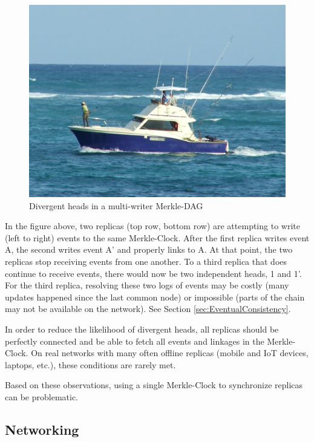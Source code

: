 \documentclass{comjnl}
\begin{document}
\begin{figure}
  \includegraphics[width=\linewidth]{boat.jpg}
  \caption{Divergent heads in a multi-writer Merkle-DAG }
  \label{fig:merkledag}
\end{figure}

In the figure above, two replicas (top row, bottom row) are attempting to write (left to right) events to the same Merkle-Clock. After the first replica writes event A, the second writes event A’ and properly links to A. At that point, the two replicas stop receiving events from one another. To a third replica that does continue to receive events, there would now be two independent heads, 1 and 1’. For the third replica, resolving these two logs of events may be costly (many updates happened since the last common node) or impossible (parts of the chain may not be available on the network). See Section  \ref{sec:EventualConsistency}.

In order to reduce the likelihood of divergent heads, all replicas should be perfectly connected and be able to fetch all events and linkages in the Merkle-Clock. On real networks with many often offline replicas (mobile and IoT devices, laptops, etc.), these conditions are rarely met.

Based on these observations, using a single Merkle-Clock to synchronize replicas can be problematic.

\subsection{Networking}
\end{document}
